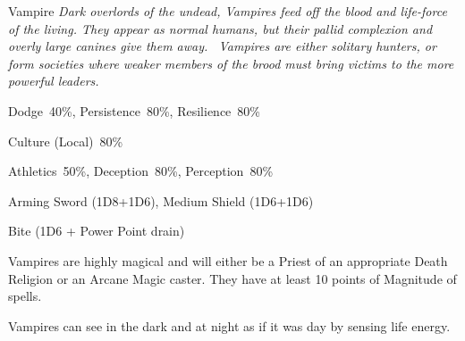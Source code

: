 \begin{monsterbox}{Vampire}
	\textit{Dark overlords of the undead, Vampires feed off the blood and life-force of the living. They appear as normal humans, but their pallid complexion and overly large canines give them away.  Vampires are either solitary hunters, or form societies where weaker members of the brood must bring victims to the more powerful leaders.}\\
	\rpghline
	\basics[%
        hitpoints  = 18, 
	majorwound = 9,
	damagemodifier = +1D6,
	powerpoints = 0 (see below),
	movementrate = 15m,
	armor = Chainmail (5AP) or Platemail (6AP) for High Vampires,
	plunderrating = 4
	]
	\rpghline%
	\stats[ %
		STR = 3D6+12 (23),
		CON = 3D6+12 (23),
		DEX = 3D6    (11),
		SIZ = 2D6+6  (13),
		INT = 2D6+6  (13),
		POW = 0      (0),
		CHA = 3D6    (11)
	]
	\rpghline
	\begin{rpg-monsteraction}[Resistances]
		Dodge~40\%, Persistence~80\%, Resilience~80\%
	\end{rpg-monsteraction}
	\begin{rpg-monsteraction}[Knowledge]
		Culture (Local)~80\%
	\end{rpg-monsteraction}
	\begin{rpg-monsteraction}[Practical]
		Athletics~50\%, Deception~80\%, Perception~80\%
	\end{rpg-monsteraction}
	\begin{rpg-monsteraction}
		Arming Sword (1D8+1D6), Medium Shield (1D6+1D6)
	\end{rpg-monsteraction}
	\begin{rpg-monsteraction}
		Bite (1D6 + Power Point drain)
	\end{rpg-monsteraction}
	\begin{rpg-monsteraction}[Magic]
		Vampires are highly magical and will either be a Priest of an appropriate Death Religion or an Arcane Magic caster. They have at least 10 points of Magnitude of spells.
	\end{rpg-monsteraction}
	\begin{rpg-monsteraction}
		Vampires can see in the dark and at night as if it was day by sensing life energy.
	\end{rpg-monsteraction}

\end{monsterbox}
